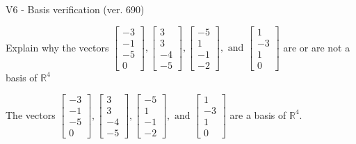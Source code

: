 \begin{exercise}
  \begin{exerciseTitle}V6 - Basis verification (ver. 690)\end{exerciseTitle}
  \begin{exerciseStatement}
    Explain why the vectors \(\left[\begin{array}{r}
-3 \\
-1 \\
-5 \\
0
\end{array}\right] , \left[\begin{array}{r}
3 \\
3 \\
-4 \\
-5
\end{array}\right] , \left[\begin{array}{r}
-5 \\
1 \\
-1 \\
-2
\end{array}\right] , \text{ and } \left[\begin{array}{r}
1 \\
-3 \\
1 \\
0
\end{array}\right]\) are or are not a basis of \(\mathbb{R}^4\)	


  \end{exerciseStatement}
  \begin{exerciseAnswer}
   The vectors \(\left[\begin{array}{r}
-3 \\
-1 \\
-5 \\
0
\end{array}\right] , \left[\begin{array}{r}
3 \\
3 \\
-4 \\
-5
\end{array}\right] , \left[\begin{array}{r}
-5 \\
1 \\
-1 \\
-2
\end{array}\right] , \text{ and } \left[\begin{array}{r}
1 \\
-3 \\
1 \\
0
\end{array}\right]\) 
  	 are  a basis of \(\mathbb{R}^4\).
  


  \end{exerciseAnswer}
\end{exercise}